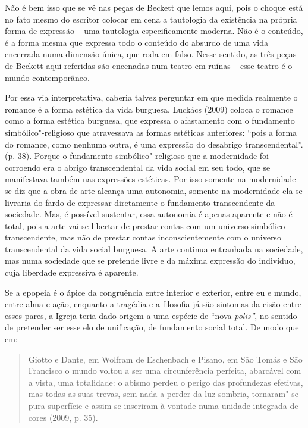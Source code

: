 Não é bem isso que se vê nas peças de Beckett que lemos aqui, pois o choque está no fato mesmo do escritor colocar em cena a
tautologia da existência na própria forma de expressão -- uma tautologia
especificamente moderna. Não é o conteúdo, é a forma mesma que expressa
todo o conteúdo do absurdo de uma vida encerrada numa dimensão única,
que roda em falso. Nesse sentido, as três peças de Beckett aqui
referidas são encenadas num teatro em ruínas -- esse teatro é o mundo
contemporâneo.

Por essa via interpretativa, caberia talvez perguntar em que medida
realmente o romance é a forma estética da vida burguesa. Luckács (2009)
coloca o romance como a forma estética burguesa, que expressa o
afastamento com o fundamento simbólico"-religioso que atravessava as
formas estéticas anteriores: ``pois a forma do romance, como nenhuma
outra, é uma expressão do desabrigo transcendental''. (p. 38). Porque o
fundamento simbólico"-religioso que a modernidade foi corroendo era o
abrigo transcendental da vida social em seu todo, que se manifestava
também nas expressões estéticas. Por isso somente na modernidade se diz
que a obra de arte alcança uma autonomia, somente na modernidade ela se
livraria do fardo de expressar diretamente o fundamento transcendente da
sociedade. Mas, é possível sustentar, essa autonomia é apenas aparente e
não é total, pois a arte vai se libertar de prestar contas com um
universo simbólico transcendente, mas não de prestar contas
inconscientemente com o universo transcendental da vida social burguesa.
A arte continua entranhada na sociedade, mas numa sociedade que se
pretende livre e da máxima expressão do indivíduo, cuja liberdade expressiva é aparente.

Se a epopeia é o ápice da congruência entre interior e exterior, entre
eu e mundo, entre alma e ação, enquanto a tragédia e a filosofia já são
sintomas da cisão entre esses pares, a Igreja teria dado origem a uma
espécie de ``nova \emph{polis''}, no sentido de pretender ser esse elo
de unificação, de fundamento social total. De modo que em:

\begin{quote}
Giotto e Dante, em Wolfram de Eschenbach e Pisano, em São Tomás e São
Francisco o mundo voltou a ser uma circunferência perfeita, abarcável
com a vista, uma totalidade: o abismo perdeu o perigo das profundezas
efetivas, mas todas as suas trevas, sem nada a perder da luz sombria,
tornaram"-se pura superfície e assim se inseriram à vontade numa unidade
integrada de cores (2009, p. 35).
\end{quote}

